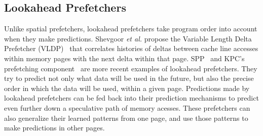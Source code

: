 

\subsection{Lookahead Prefetchers}

Unlike spatial prefetchers, lookahead prefetchers take program order into
account when they make predictions.  Shevgoor \textit{et al.} propose the Variable 
Length Delta Prefetcher (VLDP)~\cite{VLDP} that correlates histories of
deltas between cache line accesses within memory pages with the next delta
within that page.  SPP~\cite{SPP} and KPC's prefetching component~\cite{KPC} are
more recent examples of lookahead prefetchers.  They try to predict not only what
data will be used in the future, but also the precise order in which the data
will be used, within a given page.  Predictions made by lookahead prefetchers can
be fed back into their prediction mechanisms to predict even further down 
a speculative path of memory acesses. These prefetchers can also generalize their
learned patterns from one page, and use those patterns to make predictions in 
other pages.



